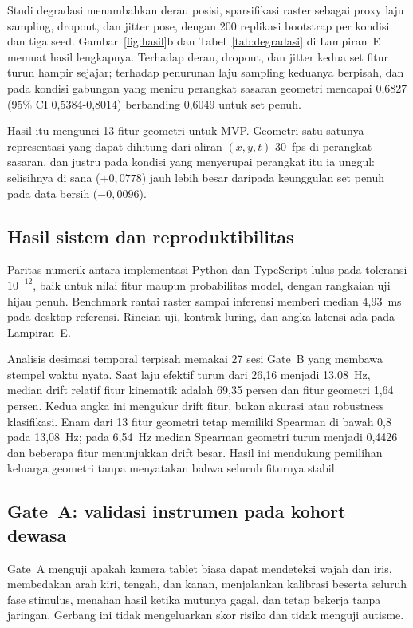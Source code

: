 \documentclass{article}
\begin{document}
Studi degradasi menambahkan derau posisi, sparsifikasi raster sebagai proxy laju sampling,
dropout, dan jitter pose, dengan 200 replikasi bootstrap per kondisi dan tiga seed.
Gambar~\ref{fig:hasil}b dan Tabel~\ref{tab:degradasi} di Lampiran~E memuat hasil lengkapnya.
Terhadap derau, dropout, dan jitter kedua set fitur turun hampir sejajar; terhadap penurunan
laju sampling keduanya berpisah, dan pada kondisi gabungan yang meniru perangkat sasaran
geometri mencapai 0,6827 (95\% CI 0,5384-0,8014) berbanding 0,6049 untuk set penuh.

Hasil itu mengunci 13 fitur geometri untuk MVP. Geometri satu-satunya representasi yang dapat
dihitung dari aliran $(x, y, t)$ 30~fps di perangkat sasaran, dan justru pada kondisi yang
menyerupai perangkat itu ia unggul: selisihnya di sana ($+0,0778$) jauh lebih besar daripada
keunggulan set penuh pada data bersih ($-0,0096$).

\subsection{Hasil sistem dan reproduktibilitas}

Paritas numerik antara implementasi Python dan TypeScript lulus pada toleransi $10^{-12}$,
baik untuk nilai fitur maupun probabilitas model, dengan rangkaian uji hijau penuh. Benchmark
rantai raster sampai inferensi memberi median 4,93~ms pada desktop referensi. Rincian uji,
kontrak luring, dan angka latensi ada pada Lampiran~E.

Analisis desimasi temporal terpisah memakai 27 sesi Gate~B yang membawa stempel waktu nyata.
Saat laju efektif turun dari 26,16 menjadi 13,08~Hz, median drift relatif fitur kinematik
adalah 69,35 persen dan fitur geometri 1,64 persen. Kedua angka ini mengukur drift fitur,
bukan akurasi atau robustness klasifikasi. Enam dari 13 fitur geometri tetap memiliki
Spearman di bawah 0,8 pada 13,08~Hz; pada 6,54~Hz median Spearman geometri turun menjadi
0,4426 dan beberapa fitur menunjukkan drift besar. Hasil ini mendukung pemilihan keluarga
geometri tanpa menyatakan bahwa seluruh fiturnya stabil.

\subsection{Gate~A: validasi instrumen pada kohort dewasa}
\label{sec:gatea}

Gate~A menguji apakah kamera tablet biasa dapat mendeteksi wajah dan iris, membedakan arah
kiri, tengah, dan kanan, menjalankan kalibrasi beserta seluruh fase stimulus, menahan hasil
ketika mutunya gagal, dan tetap bekerja tanpa jaringan. Gerbang ini tidak mengeluarkan skor
risiko dan tidak menguji autisme.
\end{document}
